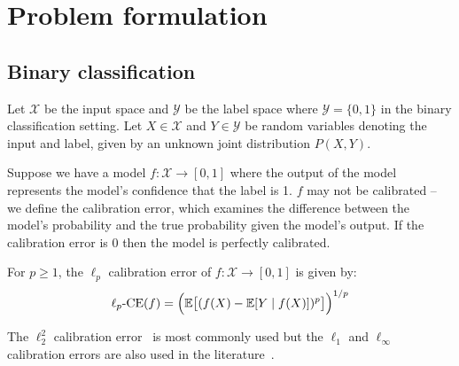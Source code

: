 \section{Problem formulation}
\label{sec:formulation}

\newcommand{\lpce}[0]{\ensuremath{\ell_p\mbox{-CE}}}
\newcommand{\ltwoce}[0]{\ensuremath{\ell_2\mbox{-CE}}}
\newcommand{\squaredce}[0]{\ensuremath{\ell_2^2\mbox{-CE}}}
\newcommand{\topsquaredce}[0]{\ensuremath{\ell_2^2\mbox{-TCE}}}
\newcommand{\margsquaredce}[0]{\ensuremath{\ell_2^2\mbox{-MCE}}}

\subsection{Binary classification}

Let $\mathcal{X}$ be the input space and $\mathcal{Y}$ be the label space where $\mathcal{Y} = \{0, 1\}$ in the binary classification setting.
Let $X \in \mathcal{X}$ and $Y \in \mathcal{Y}$ be random variables denoting the input and label, given by an unknown joint distribution $P(X, Y)$.

Suppose we have a model $f : \mathcal{X} \to [0, 1]$ where the output of the model represents the model's confidence that the label is 1. $f$ may not be calibrated -- we define the calibration error, which examines the difference between the model's probability and the true probability given the model's output. If the calibration error is $0$ then the model is perfectly calibrated.

\begin{definition}
For $p \geq 1$, the $\ell_p$ calibration error of $f : \mathcal{X} \to [0, 1]$ is given by:
\begin{align}
\lpce(f) = \Big(\expect\big[ (f(X) - \expect[Y \; | \; f(X)])^p \big] \Big)^{1/p}
\end{align}
\end{definition}

The $\ell_2^2$ calibration error~\cite{nguyen2015posterior, hendrycks2019anomaly, kuleshov2015calibrated, hendrycks2019pretraining, murphy1973vector,degroot1983forecasters} is most commonly used but the $\ell_1$ and $\ell_{\infty}$ calibration errors are also used in the literature~\cite{guo2017calibration}.

